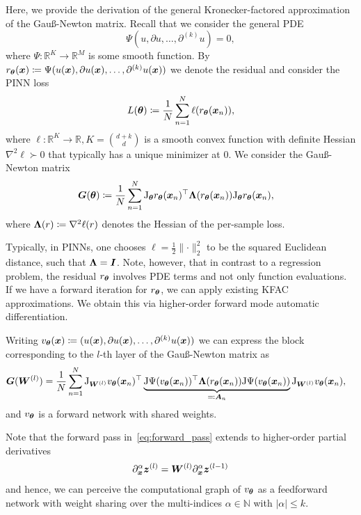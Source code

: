 Here, we provide the derivation of the general Kronecker-factored approximation of the Gauß-Newton matrix. 
Recall that we consider the general PDE
\begin{equation}
    \Psi(u, \partial u, \dots, \partial^{(k)} u) = 0,
\end{equation}
where $\Psi\colon \mathbb R^{K}\to\mathbb R^M$ is some smooth function.
By $r_{\bm{\theta}}({\bm{x}})\coloneqq \Psi(u({\bm{x}}), \partial u({\bm{x}}), \dots, \partial^{(k)} u({\bm{x}}))$ we denote the residual and consider the PINN loss
\begin{equation}
    L({\bm{\theta}})\coloneqq \frac1N\sum_{n=1}^N \ell(r_{{\bm{\theta}}}({\bm{x}}_n)),
\end{equation}
where $\ell\colon\mathbb R^K\to\mathbb R, K=\binom{d+k}{d}$ is a smooth convex function with definite Hessian $\nabla^2\ell\succ0$ that typically has a unique minimizer at $0$. 
We consider the Gauß-Newton matrix
\begin{align}
    {\bm{G}}({\bm{\theta}}) & \coloneqq \frac1N\sum_{n=1}^N \mathrm{J}_{\bm{\theta}} r_{\bm{\theta}}({\bm{x}}_n)^\top {\bm{\Lambda}}(r_{\bm{\theta}}({\bm{x}}_n)) \mathrm{J}_{\bm{\theta}} r_{\bm{\theta}}({\bm{x}}_n),
\end{align}
where ${\bm{\Lambda}}(r)\coloneqq \nabla^2 \ell(r)$ denotes the Hessian of the per-sample loss. 

Typically, in PINNs, one chooses $\ell = \frac12\lVert \cdot \rVert_2^2$ to be the squared Euclidean distance, such that ${\bm{\Lambda}} = {\bm{I}}$.
Note, however, that in contrast to a regression problem, the residual $r_{\bm{\theta}}$ involves PDE terms and not only function evaluations.
If we have a forward iteration for $r_{\bm{\theta}}$, we can apply existing KFAC approximations.
We obtain this via higher-order forward mode automatic differentiation.

Writing $v_\vtheta(\vx)\coloneqq (%
u(\vx), \partial u(\vx), \dots, \partial^{(k)} u(\vx))$
we can express the block corresponding to the $l$-th layer of the Gauß-Newton matrix as 
\begin{align}
    {\bm{G}}({\bm{W}}^{(l)}) & = \frac1N\sum_{n=1}^N \mathrm{J}_{{\bm{W}}^{(l)}} v_{\bm{\theta}}({\bm{x}}_n)^\top \underbrace{\mathrm{J} \Psi(v_{\bm{\theta}}({\bm{x}}_n))^\top {\bm{\Lambda}}(r_{\bm{\theta}}({\bm{x}}_n)) \mathrm{J} \Psi(v_{\bm{\theta}}({\bm{x}}_n))}_{\eqqcolon {\bm{A}}_n}  \mathrm{J}_{{\bm{W}}^{(l)}} v_{\bm{\theta}}({\bm{x}}_n),
\end{align}
and $v_{\bm{\theta}}$ is a forward network with shared weights.

Note that the forward pass in~\eqref{eq:forward_pass} extends to higher-order partial derivatives 
\begin{align}
    \partial_{\bm{x}}^\alpha {\bm{z}}^{(l)} = {\bm{W}}^{(l)}\partial_{\bm{x}}^\alpha {\bm{z}}^{(l-1)} 
\end{align}
and hence, we can perceive the computational graph of $v_{\bm{\theta}}$ as a feedforward network with weight sharing over the multi-indices $\alpha\in\mathbb N$ with $\lvert \alpha \rvert \le k$.


